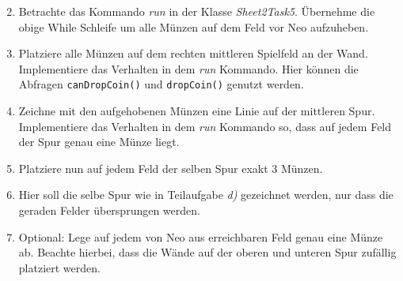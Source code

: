 \begin{enumerate} \setcounter{enumi}{1}
    \item Betrachte das Kommando \textit{run} in der Klasse \textit{Sheet2Task5}. 
        Übernehme die obige While Schleife um alle Münzen auf dem Feld vor Neo aufzuheben.
    \item Platziere alle Münzen auf dem rechten mittleren Spielfeld an der Wand. 
        Implementiere das Verhalten in dem \textit{run} Kommando.
        Hier können die Abfragen \lstinline{canDropCoin()} und \lstinline{dropCoin()} genutzt werden.
    \item Zeichne mit den aufgehobenen Münzen eine Linie auf der mittleren Spur. 
        Implementiere das Verhalten in dem \textit{run} Kommando so, dass auf jedem Feld der Spur genau eine Münze liegt.
    \item Platziere nun auf jedem Feld der selben Spur exakt 3 Münzen.
    \item Hier soll die selbe Spur wie in Teilaufgabe \textit{d)} gezeichnet werden, nur dass die geraden Felder übersprungen werden.
    \item Optional: Lege auf jedem von Neo aus erreichbaren Feld genau eine Münze ab. 
        Beachte hierbei, dass die Wände auf der oberen und unteren Spur zufällig platziert werden.
\end{enumerate}
